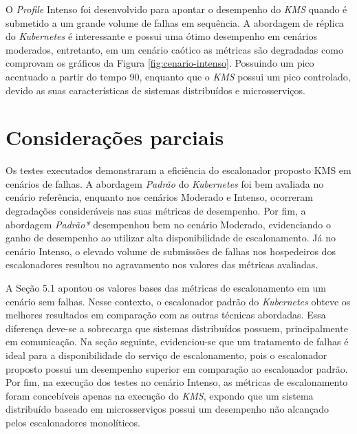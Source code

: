 O \textit{Profile} Intenso foi desenvolvido para apontar o desempenho do \textit{KMS} quando é submetido a um grande volume de falhas em sequência. A abordagem de réplica do \textit{Kubernetes} é interessante e possui uma ótimo desempenho em cenários moderados, entretanto, em um cenário caótico as métricas são degradadas como comprovam os gráficos da Figura \ref{fig:cenario-intenso}. Possuindo um pico acentuado a partir do tempo 90, enquanto que o \textit{KMS} possui um pico controlado, devido as suas características de sistemas distribuídos e microsserviços.

\section{Considerações parciais}
Os testes executados demonstraram a eficiência do escalonador proposto \ac{KMS} em cenários de falhas. A abordagem \textit{Padrão} do \textit{Kubernetes} foi bem avaliada no cenário referência, enquanto nos cenários Moderado e Intenso, ocorreram degradações consideráveis nas suas métricas de desempenho. Por fim, a abordagem \textit{Padrão*} desempenhou bem no cenário Moderado, evidenciando o ganho de desempenho ao utilizar alta disponibilidade de escalonamento. Já no cenário Intenso, o elevado volume de submissões de falhas nos hospedeiros dos escalonadores resultou no agravamento nos valores das métricas avaliadas.

A Seção 5.1 apontou os valores bases das métricas de escalonamento em um cenário sem falhas. Nesse contexto, o escalonador padrão do \textit{Kubernetes} obteve os melhores resultados em comparação com as outras técnicas abordadas. Essa diferença deve-se a sobrecarga que sistemas distribuídos possuem, principalmente em comunicação. Na seção seguinte, evidenciou-se que um tratamento de falhas é ideal para a disponibilidade do serviço de escalonamento, pois o escalonador proposto possui um desempenho superior em comparação ao escalonador padrão. Por fim, na execução dos testes no cenário Intenso, as métricas de escalonamento foram concebíveis apenas na execução do \textit{KMS}, expondo que um sistema distribuído baseado em microsserviços possui um desempenho não alcançado pelos escalonadores monolíticos.




















